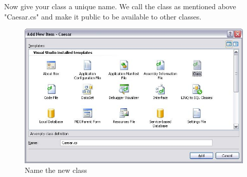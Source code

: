 Now give your class a unique name. We call the class as mentioned above "Caesar.cs" and make it public to be available to other classes.
\begin{figure}[h!]
	\centering
		\includegraphics[width=1.00\textwidth]{figures/name_new_class.jpg}
	\caption{Name the new class}
	\label{fig:name_new_class}
\end{figure}
